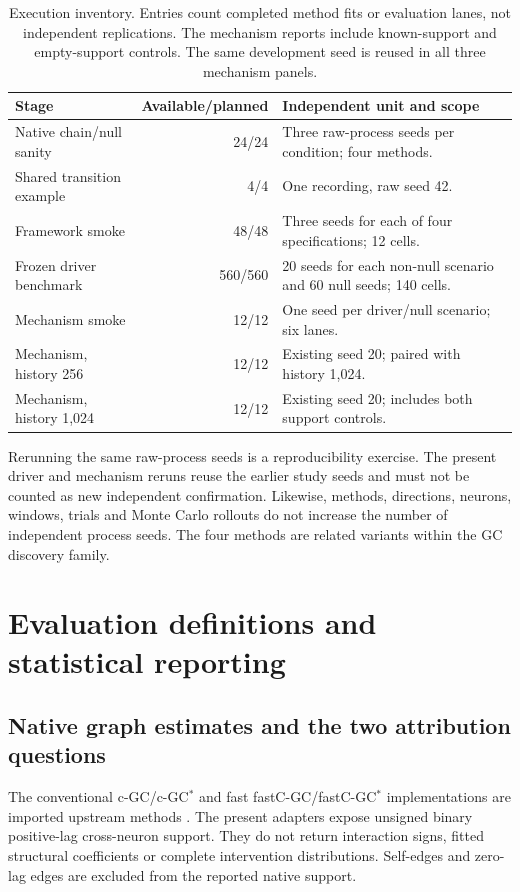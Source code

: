 \documentclass[11pt,a4paper]{article}
\newcommand{\cgc}{c-GC}
\newcommand{\cgcs}{c-GC$^{*}$}
\newcommand{\fastcgc}{fastC-GC}
\newcommand{\fastcgcs}{fastC-GC$^{*}$}
\begin{document}
\begin{table}[htbp]
\centering
\small
\caption{Execution inventory. Entries count completed method fits or evaluation
lanes, not independent replications. The mechanism reports include known-support
and empty-support controls. The same development seed is reused in all three
mechanism panels.}
\label{tab:inventory}
\begin{tabular}{@{}p{4.2cm}rp{8.1cm}@{}}
\toprule
Stage & Available/planned & Independent unit and scope \\
\midrule
Native chain/null sanity & 24/24 & Three raw-process seeds per condition; four methods. \\
Shared transition example & 4/4 & One recording, raw seed 42. \\
Framework smoke & 48/48 & Three seeds for each of four specifications; 12 cells. \\
Frozen driver benchmark & 560/560 & 20 seeds for each non-null scenario and 60 null seeds; 140 cells. \\
Mechanism smoke & 12/12 & One seed per driver/null scenario; six lanes. \\
Mechanism, history 256 & 12/12 & Existing seed 20; paired with history 1,024. \\
Mechanism, history 1,024 & 12/12 & Existing seed 20; includes both support controls. \\
\bottomrule
\end{tabular}
\end{table}

Rerunning the same raw-process seeds is a reproducibility exercise. The present
driver and mechanism reruns reuse the earlier study seeds and must not be counted
as new independent confirmation. Likewise, methods, directions, neurons, windows,
trials and Monte Carlo rollouts do not increase the number of independent process
seeds. The four methods are related variants within the GC discovery family.

\section{Evaluation definitions and statistical reporting}
\label{sec:definitions}

\subsection{Native graph estimates and the two attribution questions}

The conventional \cgc/\cgcs{} and fast \fastcgc/\fastcgcs{} implementations are
imported upstream methods \citep{adedayo2025cgc,adedayo2026fastcgc}. The present
adapters expose unsigned binary positive-lag cross-neuron support. They do not
return interaction signs, fitted structural coefficients or complete intervention
distributions. Self-edges and zero-lag edges are excluded from the reported native
support.
\end{document}
